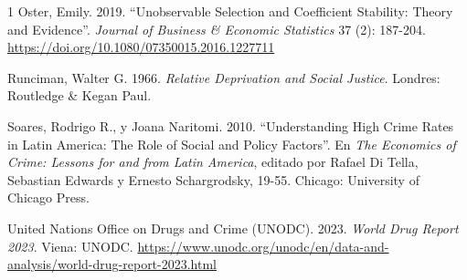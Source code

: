 \documentclass[12pt,a4paper]{article}
\newcommand{\refitem}[1]{%
  \noindent\hangindent=1.25cm\hangafter=1 #1\par
}
\begin{document}
\begin{spacing}{1}
\refitem{Oster, Emily. 2019. “Unobservable Selection and Coefficient Stability: Theory and Evidence”. \textit{Journal of Business \& Economic Statistics} 37 (2): 187-204. \url{https://doi.org/10.1080/07350015.2016.1227711}}

\refitem{Runciman, Walter G. 1966. \textit{Relative Deprivation and Social Justice}. Londres: Routledge \& Kegan Paul.}

\refitem{Soares, Rodrigo R., y Joana Naritomi. 2010. “Understanding High Crime Rates in Latin America: The Role of Social and Policy Factors”. En \textit{The Economics of Crime: Lessons for and from Latin America}, editado por Rafael Di Tella, Sebastian Edwards y Ernesto Schargrodsky, 19-55. Chicago: University of Chicago Press.}

\refitem{United Nations Office on Drugs and Crime (UNODC). 2023. \textit{World Drug Report 2023}. Viena: UNODC. \url{https://www.unodc.org/unodc/en/data-and-analysis/world-drug-report-2023.html}}

\end{spacing}
\end{document}
